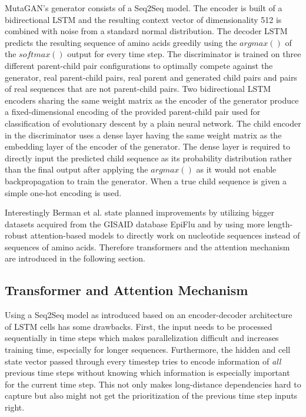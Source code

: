 MutaGAN's generator consists of a \ac{Seq2Seq} model. The encoder is built of a bidirectional \ac{LSTM} and the resulting context vector of dimensionality 512 is combined with noise from a standard normal dis\-tri\-bu\-ti\-on. The decoder \ac{LSTM} predicts the resulting sequence of amino acids greedily using the $argmax()$ of the $softmax()$ output for every time step. The discriminator is trained on three different parent-child pair configurations to optimally compete against the generator, real parent-child pairs, real parent and generated child pairs and pairs of real sequences that are not parent-child pairs. Two bidirectional \ac{LSTM} encoders sharing the same weight matrix as the encoder of the generator produce a fixed-dimensional encoding of the provided parent-child pair used for classification of evolutionary descent by a plain neural network. The child encoder in the discriminator uses a dense layer having the same weight matrix as the embedding layer of the encoder of the generator. The dense layer is required to directly input the predicted child sequence as its probability distribution rather than the final output after applying the $argmax()$ as it would not enable backpropagation to train the generator. When a true child sequence is given a simple one-hot encoding is used. \cite{Berman2020}

Interestingly Berman et al. \cite{Berman2020} state planned improvements by utilizing bigger datasets acquired from the \ac{GISAID} database EpiFlu and by using more length-robust attention-based models to directly work on nucleotide sequences instead of sequences of amino acids. Therefore transformers and the attention mechanism are introduced in the following section.

\subsection{Transformer and Attention Mechanism} \label{fundamentalsH}

Using a \ac{Seq2Seq} model as introduced based on an encoder-decoder architecture of \ac{LSTM} cells has some drawbacks. First, the input needs to be processed sequentially in time steps which makes parallelization difficult and increases training time, especially for longer sequences. Fur\-ther\-mo\-re, the hidden and cell state vector passed through every timestep tries to encode information of \textit{all} previous time steps without knowing which information is especially important for the current time step. This not only makes long-distance dependencies hard to capture but also might not get the prioritization of the previous time step inputs right. \cite{Bahdanau2016, Vaswani2017} 

